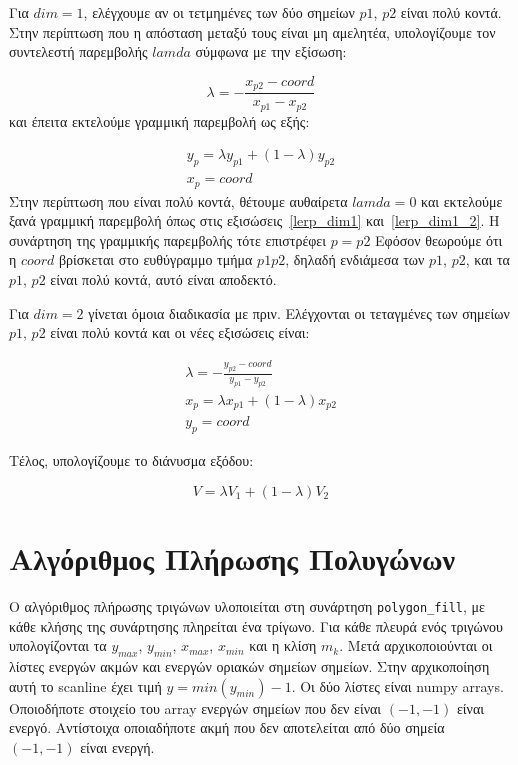\documentclass{article}
\begin{document}
Για $dim = 1$, ελέγχουμε αν οι τετμημένες των δύο σημείων 
$p1$, $p2$ είναι πολύ κοντά. Στην περίπτωση που η απόσταση μεταξύ τους είναι μη αμελητέα,
υπολογίζουμε τον συντελεστή παρεμβολής $lamda$ σύμφωνα με την εξίσωση:

\begin{equation}
    \lambda = - \frac{x_{p2} - coord}{x_{p1} - x_{p2}}
\end{equation}
και έπειτα εκτελούμε γραμμική παρεμβολή ως εξής:

\begin{gather}
    y_p = \lambda y_{p1} + (1-\lambda) y_{p2}\label{lerp_dim1} \\
    x_p = coord\label{lerp_dim1_2}
\end{gather}
Στην περίπτωση που είναι πολύ κοντά, θέτουμε αυθαίρετα
$lamda = 0$ και εκτελούμε ξανά γραμμική παρεμβολή όπως στις
εξισώσεις~\ref{lerp_dim1} και~\ref{lerp_dim1_2}. Η συνάρτηση της γραμμικής παρεμβολής 
τότε επιστρέφει $p = p2$ Εφόσον θεωρούμε ότι η $coord$ βρίσκεται στο
ευθύγραμμο τμήμα $p1p2$, δηλαδή ενδιάμεσα των $p1$, $p2$, 
και τα $p1$, $p2$ είναι πολύ κοντά, αυτό είναι αποδεκτό.

Για $dim = 2$ γίνεται όμοια διαδικασία με πριν. Ελέγχονται οι
τεταγμένες των σημείων $p1$, $p2$ είναι πολύ κοντά και οι νέες 
εξισώσεις είναι:

\begin{gather}
    \lambda = - \frac{y_{p2} - coord}{y_{p1} - y_{p2}}\\
    x_p = \lambda x_{p1} + (1-\lambda) x_{p2}\label{lerp_dim2} \\
    y_p = coord\label{lerp_dim2_2}
\end{gather}

Τέλος, υπολογίζουμε το διάνυσμα εξόδου:

\begin{equation}
    V = \lambda V_{1} + (1-\lambda) V_{2}
\end{equation}

\section{Αλγόριθμος Πλήρωσης Πολυγώνων}
Ο αλγόριθμος πλήρωσης τριγώνων υλοποιείται στη συνάρτηση \verb|polygon_fill|,
με κάθε κλήσης της συνάρτησης πληρείται ένα τρίγωνο. Για κάθε πλευρά ενός 
τριγώνου υπολογίζονται τα $y_{max}$, $y_{min}$, $x_{max}$, $x_{min}$ 
και η κλίση $m_k$. Μετά αρχικοποιούνται οι λίστες ενεργών ακμών και ενεργών 
οριακών σημείων σημείων. Στην αρχικοποίηση αυτή το scanline έχει τιμή $y = min(y_{min}) - 1$.
Οι δύο λίστες είναι numpy arrays. Οποιοδήποτε στοιχείο του array ενεργών σημείων που δεν 
είναι $(-1, -1)$ είναι ενεργό. Αντίστοιχα οποιαδήποτε ακμή που δεν αποτελείται από 
δύο σημεία $(-1, -1)$ είναι ενεργή.
\end{document}

